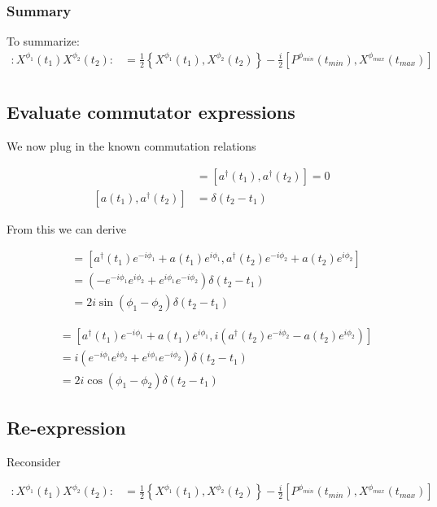 \documentclass[12pt]{article}
\begin{document}
\subsubsection{Summary}

To summarize:
\begin{align}
:X^{\phi_1}(t_1)X^{\phi_2}(t_2): &= \frac{1}{2}\left\{X^{\phi_1}(t_1), X^{\phi_2}(t_2)\right\} - \frac{i}{2}\left[P^{\phi_{min}}(t_{min}), X^{\phi_{max}}(t_{max})\right]\\
\end{align}

\subsection{Evaluate commutator expressions}

We now plug in the known commutation relations

\begin{align}
[a(t_1), a(t_2)] &= [a^{\dag}(t_1), a^{\dag}(t_2)] = 0\\
[a(t_1), a^{\dag}(t_2)] &= \delta(t_2-t_1)
\end{align}

From this we can derive

\begin{align}
[X^{\phi_1}(t_1), X^{\phi_2}(t_2)] &= [a^{\dag}(t_1)e^{-i\phi_1} + a(t_1)e^{i\phi_1}, a^{\dag}(t_2)e^{-i\phi_2} + a(t_2)e^{i\phi_2}]\\
&= (-e^{-i\phi_1}e^{i\phi_2} + e^{i\phi_1}e^{-i\phi_2})\delta(t_2-t_1)\\
&= 2i\sin(\phi_1-\phi_2) \delta(t_2-t_1)
\end{align}

\begin{align}
[X^{\phi_1}(t_1), P^{\phi_2}(t_2)] &= [a^{\dag}(t_1)e^{-i\phi_1} + a(t_1)e^{i\phi_1}, i(a^{\dag}(t_2)e^{-i\phi_2} - a(t_2)e^{i\phi_2})]\\
&=i(e^{-i\phi_1}e^{i\phi_2} + e^{i\phi_1}e^{-i\phi_2})\delta(t_2-t_1)\\
&=2i\cos(\phi_1-\phi_2)\delta(t_2-t_1) 
\end{align}

\subsection{Re-expression}

Reconsider 

\begin{align}
:X^{\phi_1}(t_1)X^{\phi_2}(t_2): &= \frac{1}{2}\left\{X^{\phi_1}(t_1), X^{\phi_2}(t_2)\right\} - \frac{i}{2}\left[P^{\phi_{min}}(t_{min}), X^{\phi_{max}}(t_{max})\right]\\
\end{align}
\end{document}
